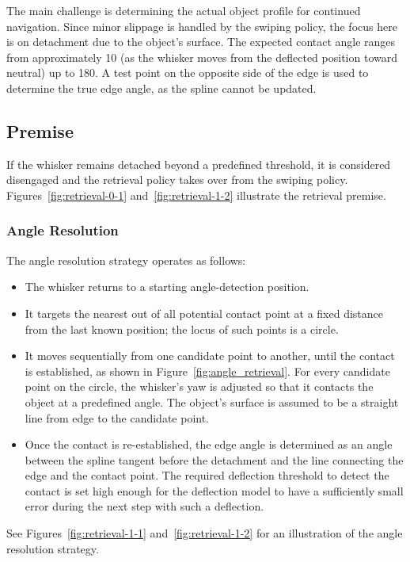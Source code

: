 The main challenge is determining the actual object profile for continued navigation.
Since minor slippage is handled by the swiping policy, the focus here is on detachment due to the object's surface.
The expected contact angle ranges from approximately 10\textdegree{} (as the whisker moves from the deflected position toward neutral) up to 180\textdegree.
A test point on the opposite side of the edge is used to determine the true edge angle, as the spline cannot be updated.

\subsection{Premise}
If the whisker remains detached beyond a predefined threshold, it is considered disengaged and the retrieval policy takes over from the swiping policy.
Figures~\ref{fig:retrieval-0-1} and~\ref{fig:retrieval-1-2} illustrate the retrieval premise.

\subsubsection{Angle Resolution}
The angle resolution strategy operates as follows:
\begin{itemize}
    \item The whisker returns to a starting angle-detection position.
    \item It targets the nearest out of all potential contact point at a fixed distance from the last known position; the locus of such points is a circle.
    \item It moves sequentially from one candidate point to another, until the contact is established, as shown in Figure~\ref{fig:angle_retrieval}.
    For every candidate point on the circle, the whisker's yaw is adjusted so that it contacts the object at a predefined angle.
    The object's surface is assumed to be a straight line from edge to the candidate point.
    \item Once the contact is re-established, the edge angle is determined as an angle between the spline tangent before the detachment and the line connecting the edge and the contact point.
    The required deflection threshold to detect the contact is set high enough for the deflection model to have a sufficiently small error during the next step with such a deflection.
\end{itemize}
See Figures~\ref{fig:retrieval-1-1} and~\ref{fig:retrieval-1-2} for an illustration of the angle resolution strategy.

